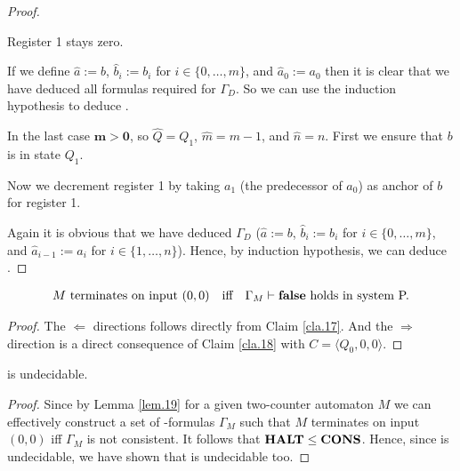 \begin{proof}
	\begin{figure}[H]
		\centering
		
	\end{figure}
	
	Register 1 stays zero.
	
	\begin{figure}[H]
		\centering
		
	\end{figure}
	
	If we define $\widehat{a}:=b$, $\widehat{b}_i:=b_i$ for $i\in\{0,\dots,m\}$, and $\widehat{a}_0:=a_0$ then it is clear that we have deduced all formulas required for $\Gamma_D$. So we can use the induction hypothesis to deduce \false{}.
	
	In the last case $\boldsymbol{m>0}$, so $\widehat{Q}=Q_1$, $\widehat{m}=m-1$, and $\widehat{n}=n$. First we ensure that $b$ is in state $Q_1$.
	
	\begin{figure}[H]
		\centering
		
	\end{figure}
	
	Now we decrement register 1 by taking $a_1$ (the predecessor of $a_0$) as anchor of $b$ for register 1.
	
	\begin{figure}[H]
		\centering
		
	\end{figure}
	
	Again it is obvious that we have deduced $\Gamma_D$ ($\widehat{a}:=b$, $\widehat{b}_i:=b_i$ for $i\in\{0,\dots,m\}$, and $\widehat{a}_{i-1}:=a_i$ for $i\in\{1,\dots,n\}$). Hence, by induction hypothesis, we can deduce \false{}.
\end{proof}

\begin{lemma}\label{lem.19}
	\begin{align*} %
		  & \text{$M$ terminates on input $(0,0)$} &   & \text{iff} & \text{$\Gamma_M\vdash\false$ holds in system P.} 
	\end{align*}
\end{lemma}
\begin{proof}
	The $\Leftarrow$ directions follows directly from Claim \ref{cla.17}. And the $\Rightarrow$ direction is a direct consequence of Claim \ref{cla.18} with $C=\langle Q_0,0,0\rangle$.
\end{proof}

\begin{theorem}
	\PCons{} is undecidable.
\end{theorem}
\begin{proof}
	Since by Lemma \ref{lem.19} for a given two-counter automaton $M$ we can effectively construct a set of \SysP-formulas $\Gamma_M$ such that $M$ terminates on input $(0,0)$ iff $\Gamma_M$ is not consistent. It follows that $\textbf{HALT}\leq\textbf{CONS}$. Hence, since \autHalt{} is undecidable, we have shown that \PCons{} is undecidable too.
\end{proof}
